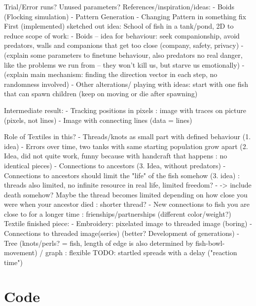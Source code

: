 \documentclass{scrartcl}
\begin{document}
Trial/Error runs? Unused parameters?
References/inspiration/ideas:
-	Boids (Flocking simulation)
-	Pattern Generation
-	Changing Pattern in something fix
First (implemented) sketched out idea:
School of fish in a tank/pond, 2D to reduce scope of work:
-	Boids – idea for behaviour: seek companionship, avoid predators, walls and companions that get too close (company, safety, privacy)
-	(explain some parameters to finetune behaviour, also predators no real danger, like the problems we run from – they won’t kill us, but starve us emotionally)
-	(explain main mechanism: finding the direction vector in each step, no randomness involved)
-	Other alterations/ playing with ideas: start with one fish that can spawn children (keep on moving or die after spawning)

Intermediate result:
-	Tracking positions in pixels : image with traces on picture (pixels, not lines)
-	Image with connecting lines (data = lines)

Role of Textiles in this?
-	Threads/knots as small part with defined behaviour (1. idea)
-	Errors over time, two tanks with same starting population grow apart (2. Idea, did not quite work, funny because with handcraft that happens : no identical pieces)
-	Connections to ancestors (3. Idea, without predators)
-	Connections to ancestors should limit the "life" of the  fish somehow (3. idea) : threads also limited, no infinite resource in real life, limited freedom?
-	-> include death somehow? Maybe the thread becomes limited depending on how close you were when your ancestor died : shorter thread?
-	New connections to fish you are close to for a longer time : frienships/partnerships (different color/weight?)
Textile finished piece:
-	Embroidery: pixelated image to threaded image (boring)
-	Connections to threaded image(series) (better? Development of generations)
-	Tree (knots/perls? = fish, length of edge is also determined by fish-bowl-movement) / graph : flexible
TODO: startled spreads with a delay ("reaction time")



\newpage
\section*{Code}


%
%
\end{document}
